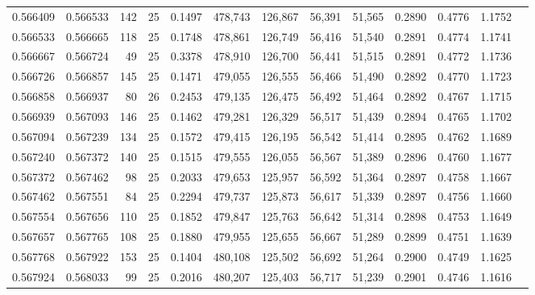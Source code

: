 \begin{tabular}{rrrrrrrrrrrrr}
0.566409 & 0.566533 &   142 &  25 &                                     0.1497 & 478,743 & 126,867 &  56,391 &  51,565 & 0.2890 & 0.4776 & 1.1752 \\
0.566533 & 0.566665 &   118 &  25 &                                     0.1748 & 478,861 & 126,749 &  56,416 &  51,540 & 0.2891 & 0.4774 & 1.1741 \\
0.566667 & 0.566724 &    49 &  25 &                                     0.3378 & 478,910 & 126,700 &  56,441 &  51,515 & 0.2891 & 0.4772 & 1.1736 \\
0.566726 & 0.566857 &   145 &  25 &                                     0.1471 & 479,055 & 126,555 &  56,466 &  51,490 & 0.2892 & 0.4770 & 1.1723 \\
0.566858 & 0.566937 &    80 &  26 &                                     0.2453 & 479,135 & 126,475 &  56,492 &  51,464 & 0.2892 & 0.4767 & 1.1715 \\
0.566939 & 0.567093 &   146 &  25 &                                     0.1462 & 479,281 & 126,329 &  56,517 &  51,439 & 0.2894 & 0.4765 & 1.1702 \\
0.567094 & 0.567239 &   134 &  25 &                                     0.1572 & 479,415 & 126,195 &  56,542 &  51,414 & 0.2895 & 0.4762 & 1.1689 \\
0.567240 & 0.567372 &   140 &  25 &                                     0.1515 & 479,555 & 126,055 &  56,567 &  51,389 & 0.2896 & 0.4760 & 1.1677 \\
0.567372 & 0.567462 &    98 &  25 &                                     0.2033 & 479,653 & 125,957 &  56,592 &  51,364 & 0.2897 & 0.4758 & 1.1667 \\
0.567462 & 0.567551 &    84 &  25 &                                     0.2294 & 479,737 & 125,873 &  56,617 &  51,339 & 0.2897 & 0.4756 & 1.1660 \\
0.567554 & 0.567656 &   110 &  25 &                                     0.1852 & 479,847 & 125,763 &  56,642 &  51,314 & 0.2898 & 0.4753 & 1.1649 \\
0.567657 & 0.567765 &   108 &  25 &                                     0.1880 & 479,955 & 125,655 &  56,667 &  51,289 & 0.2899 & 0.4751 & 1.1639 \\
0.567768 & 0.567922 &   153 &  25 &                                     0.1404 & 480,108 & 125,502 &  56,692 &  51,264 & 0.2900 & 0.4749 & 1.1625 \\
0.567924 & 0.568033 &    99 &  25 &                                     0.2016 & 480,207 & 125,403 &  56,717 &  51,239 & 0.2901 & 0.4746 & 1.1616 \\

\end{tabular}
